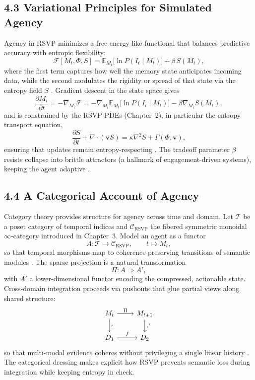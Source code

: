 \documentclass[12pt]{article}
\begin{document}
\subsection*{4.3 Variational Principles for Simulated Agency}
Agency in RSVP minimizes a free-energy-like functional that balances predictive accuracy with entropic flexibility:
\[
\mathcal{F}[M_t, \Phi, S] 
= \mathbb{E}_{M_t}\big[ \ln P(I_t \mid M_t) \big] + \beta\, S(M_t),
\]
where the first term captures how well the memory state anticipates incoming data, while the second modulates the rigidity or spread of that state via the entropy field \(S\) \citep{friston2010}. Gradient descent in the state space gives
\[
\frac{\partial M_t}{\partial t}
= -\nabla_{M_t} \mathcal{F}
= -\nabla_{M_t} \mathbb{E}_{M_t}\big[ \ln P(I_t \mid M_t) \big]
  - \beta \nabla_{M_t} S(M_t),
\]
and is constrained by the RSVP PDEs (Chapter~2), in particular the entropy transport equation,
\[
\frac{\partial S}{\partial t} + \nabla \cdot (\mathbf{v} S) 
= \kappa \nabla^2 S + \Gamma(\Phi,\mathbf{v}),
\]
ensuring that updates remain entropy-respecting \citep{jaynes2003}. The tradeoff parameter \(\beta\) resists collapse into brittle attractors (a hallmark of engagement-driven systems), keeping the agent adaptive \citep{hohwy2013, lanier2018}.

\subsection*{4.4 A Categorical Account of Agency}
Category theory provides structure for agency across time and domain. Let \(\mathcal{T}\) be a poset category of temporal indices and \(\mathcal{C}_{\text{RSVP}}\) the fibered symmetric monoidal \(\infty\)-category introduced in Chapter~3. Model an agent as a functor
\[
A : \mathcal{T} \to \mathcal{C}_{\text{RSVP}}, \qquad t \mapsto M_t,
\]
so that temporal morphisms map to coherence-preserving transitions of semantic modules \citep{lawvere2009, maclane1998}. The sparse projection is a natural transformation
\[
\Pi : A \Rightarrow A',
\]
with \(A'\) a lower-dimensional functor encoding the compressed, actionable state. Cross-domain integration proceeds via pushouts that glue partial views along shared structure:
\[
\begin{tikzcd}
M_t \arrow[r, "\Pi"] \arrow[d, "\iota"] & M_{t+1} \arrow[d, "\iota'"] \\
D_1 \arrow[r, "f"] & D_2
\end{tikzcd}
\]
so that multi-modal evidence coheres without privileging a single linear history \citep{may1999}. The categorical dressing makes explicit how RSVP prevents semantic loss during integration while keeping entropy in check.
\end{document}
